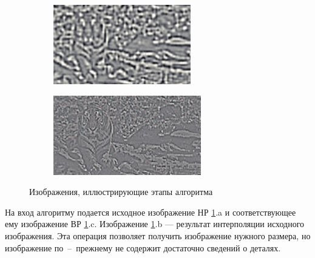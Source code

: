 \begin{figure}[!h]
\begin{subfigure}{0.35\textwidth}
        \caption{}
    \end{subfigure}
    \begin{subfigure}{0.33\textwidth}
        \centering
        \includegraphics[width=\textwidth]{assets/tiger_d}
        \caption{}
    \end{subfigure}
    \vspace{1cm}
    \begin{subfigure}{0.35\textwidth}
        \centering
        \includegraphics[width=\textwidth]{assets/tiger_e}
        \caption{}
    \end{subfigure}
    \caption{Изображения, иллюстрирующие этапы алгоритма}
    \label{tiger}
\end{figure}

На вход алгоритму подается исходное изображение НР \ref{tiger}.a и соответствующее ему изображение ВР \ref{tiger}.c. Изображение \ref{tiger}.b --- результат интерполяции исходного изображения. Эта операция позволяет получить изображение нужного размера, но изображение по~--~прежнему не содержит достаточно сведений о деталях.

\clearpage


